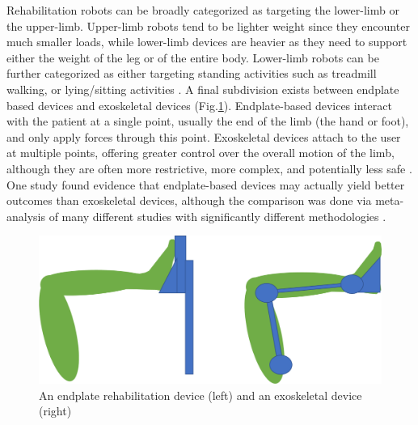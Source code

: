 \documentclass[12pt]{report}
\begin{document}
	Rehabilitation robots can be broadly categorized as targeting the lower-limb or the upper-limb. Upper-limb robots tend to be lighter weight since they encounter much smaller loads, while lower-limb devices are heavier as they need to support either the weight of the leg or of the entire body. Lower-limb robots can be further categorized as either targeting standing activities such as treadmill walking, or lying/sitting activities \cite{Calabro2016}. A final subdivision exists between endplate based devices and exoskeletal devices (Fig.\ref{fig:end_exo}). Endplate-based devices interact with the patient at a single point, usually the end of the limb (the hand or foot), and only apply forces through this point. Exoskeletal devices attach to the user at multiple points, offering greater control over the overall motion of the limb, although they are often more restrictive, more complex, and potentially less safe \cite{Chang2013}. One study found evidence that endplate-based devices may actually yield better outcomes than exoskeletal devices, although the comparison was done via meta-analysis of many different studies with significantly different methodologies \cite{Mehrholz2012} . 
	
	
	\begin{figure}[h] 
		\centering
		\includegraphics[width=0.8\linewidth]{endplate_exoskeleton}
		\caption{An endplate rehabilitation device (left) and an exoskeletal device (right)}
		\label{fig:end_exo}
	\end{figure}
\end{document}
